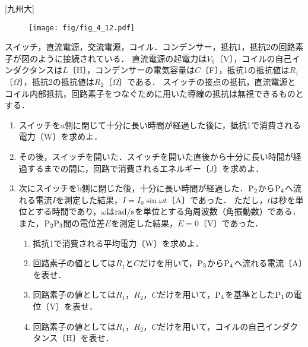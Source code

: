 




\noindent{} [九州大]

\begin{wrapfigure}{r}{6cm}
  \centering
  \texttt{[image: fig/fig\_4\_12.pdf]}
\end{wrapfigure}
スイッチ，直流電源，交流電源，コイル．コンデンサー，抵抗1，抵抗2の回路素子が図のように接続されている．
直流電源の起電力は$V_0$〔V〕，コイルの自己インダクタンスは$L$〔H〕，コンデンサーの電気容量は$C$〔F〕，抵抗1の抵抗値は$R_1$〔$\Omega$〕，抵抗2の抵抗値は$R_2$〔$\Omega$〕である．
スイッチの接点の抵抗，直流電源とコイル内部抵抗，回路素子をつなぐために用いた導線の抵抗は無視できるものとする．
\begin{enumerate}[label={問\arabic*}]
  \item スイッチをa側に閉じて十分に長い時間が経過した後に，抵抗1で消費される電力〔W〕を求めよ．
  \item その後，スイッチを開いた．スイッチを開いた直後から十分に長い時間が経過するまでの間に，回路で消費されるエネルギー〔J〕を求めよ．
  \item 次にスイッチをb側に閉じた後，十分に長い時間が経過した．$\mathrm{P}_2$から$\mathrm{P}_4$へ流れる電流$I$を測定した結果，$I = I_0 \sin \omega t$〔A〕であった．
    ただし，$t$は秒を単位とする時間であり，$\omega$は$\mathrm{rad}/\mathrm{s}$を単位とする角周波数（角振動数）である．
    また，$\mathrm{P}_2\mathrm{P}_3$間の電位差$E$を測定した結果，$E = 0$〔V〕であった．
    \begin{enumerate}[(1)]
      \item 抵抗1で消費される平均電力〔W〕を求めよ．
      \item 回路素子の値としては$R_1$と$C$だけを用いて，$\mathrm{P}_3$から$\mathrm{P}_4$へ流れる電流〔A〕を表せ．
      \item 回路素子の値としては$R_1$，$R_2$，$C$だけを用いて，$\mathrm{P}_4$を基準とした$\mathrm{P}_1$の電位〔V〕を表せ．
      \item 回路素子の値としては$R_1$，$R_2$，$C$だけを用いて，コイルの自己インダクタンス〔H〕を表せ．
    \end{enumerate}

\end{enumerate}



